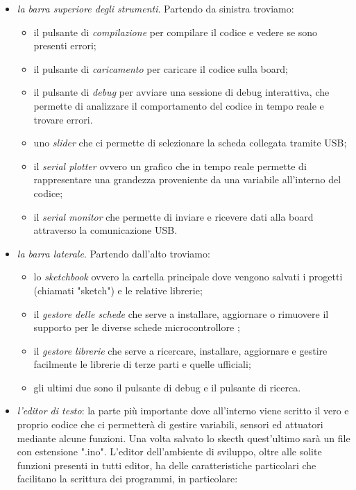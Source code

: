 \documentclass[12pt, letterpaper]{book}
\begin{document}
  \begin{itemize}[leftmargin=1.2cm, itemsep=1pt, topsep=5pt]
    \item \textit{la barra superiore degli strumenti}. Partendo da sinistra troviamo:
          \begin{itemize}[leftmargin=0.5cm, itemsep=1pt, topsep=3pt]
            \item il pulsante di \textit{compilazione} per compilare il codice e vedere se sono presenti errori;
            \item il pulsante di \textit{caricamento} per caricare il codice sulla board;
            \item il pulsante di \textit{debug} per avviare una sessione di debug interattiva, che permette di analizzare il comportamento del codice in tempo reale e trovare errori.
            \item uno \textit{slider} che ci permette di selezionare la scheda collegata tramite USB;
            \item il \textit{serial plotter} ovvero un grafico che in tempo reale permette di rappresentare una grandezza proveniente da una variabile all'interno del codice;
            \item il \textit{serial monitor} che permette di inviare e ricevere dati alla board attraverso la comunicazione USB.
          \end{itemize}
    \item \textit{la barra laterale}. Partendo dall'alto troviamo:
          \begin{itemize} [leftmargin=1.2cm, itemsep=1pt, topsep=5pt]
            \item lo \textit{sketchbook} ovvero la cartella principale dove vengono salvati i progetti (chiamati "sketch") e le relative librerie;
            \item il \textit{gestore delle schede} che serve a installare, aggiornare o rimuovere il supporto per le diverse schede microcontrollore ;
            \item il \textit{gestore librerie} che serve a ricercare, installare, aggiornare e gestire facilmente le librerie di terze parti e quelle ufficiali;
            \item gli ultimi due sono il pulsante di debug e il pulsante di ricerca.
          \end{itemize}
    \item \textit{l'editor di testo}: la parte più importante dove all'interno viene scritto il vero e proprio codice che ci permetterà di gestire variabili, sensori ed attuatori mediante alcune funzioni. Una volta salvato lo skecth quest'ultimo sarà un file con estensione ".ino". L'editor dell'ambiente di sviluppo,  oltre alle solite funzioni presenti in tutti editor, ha delle caratteristiche particolari che facilitano la scrittura dei programmi, in particolare:

\end{itemize}
\end{document}
